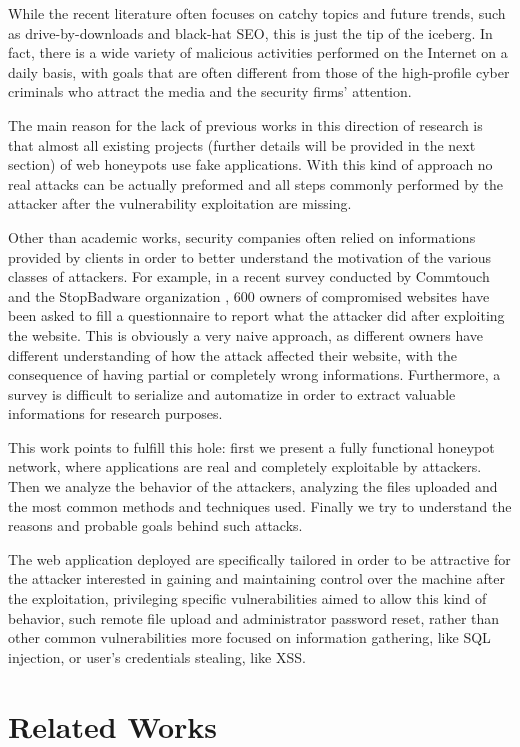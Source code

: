 While the recent literature often focuses on catchy topics and future trends, such as drive-by-downloads and black-hat SEO, this is just the tip of the iceberg. In fact, there is a wide variety of malicious activities performed on the Internet on a daily basis, with goals that are often different from those of the high-profile cyber criminals who attract the media and the security firms' attention.

The main reason for the lack of previous works in this direction of research is that almost all existing projects (further details will be provided in the next section) of web honeypots use fake applications. With this kind of approach no real attacks can be actually preformed and all steps commonly performed by the attacker after the vulnerability exploitation are missing.

Other than academic works, security companies often relied on informations provided by clients in order to better understand the motivation of the various classes of attackers. For example, in a recent survey conducted by Commtouch and the StopBadware organization \cite{stopbadawareSurvey}, 600 owners of compromised websites have been asked to fill a questionnaire to report what the attacker did after exploiting the website. This is obviously a very naive approach, as different owners have different understanding of how the attack affected their website, with the consequence of having partial or completely wrong informations. Furthermore, a survey is difficult to serialize and automatize in order to extract valuable informations for research purposes.

This work points to fulfill this hole: first we present a fully functional honeypot network, where applications are real and completely exploitable by attackers. Then we analyze the behavior of the attackers, analyzing the files uploaded and the most common methods and techniques used. Finally we try to understand the reasons and probable goals behind such attacks.

The web application deployed are specifically tailored in order to be attractive for the attacker interested in gaining and maintaining control over the machine after the exploitation, privileging specific vulnerabilities aimed to allow this kind of behavior, such remote file upload and administrator password reset, rather than other common vulnerabilities more focused on information gathering, like SQL injection, or user's credentials stealing, like XSS.

\section{Related Works}

